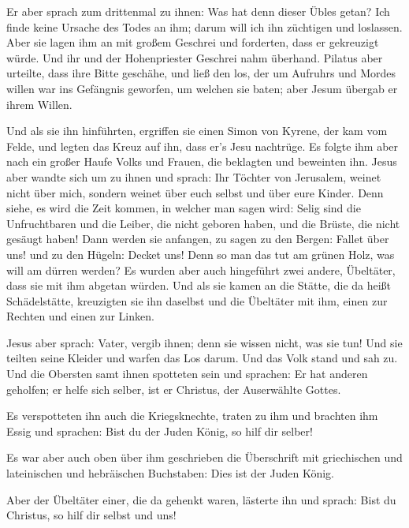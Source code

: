  Er aber sprach zum drittenmal zu ihnen: Was hat denn
dieser Übles getan? Ich finde keine Ursache des Todes an ihm; darum will
ich ihn züchtigen und loslassen.  Aber sie lagen ihm an
mit großem Geschrei und forderten, dass er gekreuzigt würde. Und ihr und
der Hohenpriester Geschrei nahm überhand.  Pilatus aber
urteilte, dass ihre Bitte geschähe,  und ließ den los,
der um Aufruhrs und Mordes willen war ins Gefängnis geworfen, um welchen
sie baten; aber Jesum übergab er ihrem Willen.

 Und als sie ihn hinführten, ergriffen sie einen Simon
von Kyrene, der kam vom Felde, und legten das Kreuz auf ihn, dass er's
Jesu nachtrüge.  Es folgte ihm aber nach ein großer Haufe
Volks und Frauen, die beklagten und beweinten ihn.  Jesus
aber wandte sich um zu ihnen und sprach: Ihr Töchter von Jerusalem,
weinet nicht über mich, sondern weinet über euch selbst und über eure
Kinder.  Denn siehe, es wird die Zeit kommen, in welcher
man sagen wird: Selig sind die Unfruchtbaren und die Leiber, die nicht
geboren haben, und die Brüste, die nicht gesäugt haben! 
Dann werden sie anfangen, zu sagen zu den Bergen: Fallet über uns! und
zu den Hügeln: Decket uns!  Denn so man das tut am grünen
Holz, was will am dürren werden?  Es wurden aber auch
hingeführt zwei andere, Übeltäter, dass sie mit ihm abgetan würden.
 Und als sie kamen an die Stätte, die da heißt
Schädelstätte, kreuzigten sie ihn daselbst und die Übeltäter mit ihm,
einen zur Rechten und einen zur Linken.

 Jesus aber sprach: Vater, vergib ihnen; denn sie wissen
nicht, was sie tun! Und sie teilten seine Kleider und warfen das Los
darum.  Und das Volk stand und sah zu. Und die Obersten
samt ihnen spotteten sein und sprachen: Er hat anderen geholfen; er
helfe sich selber, ist er Christus, der Auserwählte Gottes.

 Es verspotteten ihn auch die Kriegsknechte, traten zu
ihm und brachten ihm Essig  und sprachen: Bist du der
Juden König, so hilf dir selber!

 Es war aber auch oben über ihm geschrieben die
Überschrift mit griechischen und lateinischen und hebräischen
Buchstaben: Dies ist der Juden König.

 Aber der Übeltäter einer, die da gehenkt waren, lästerte
ihn und sprach: Bist du Christus, so hilf dir selbst und uns!

